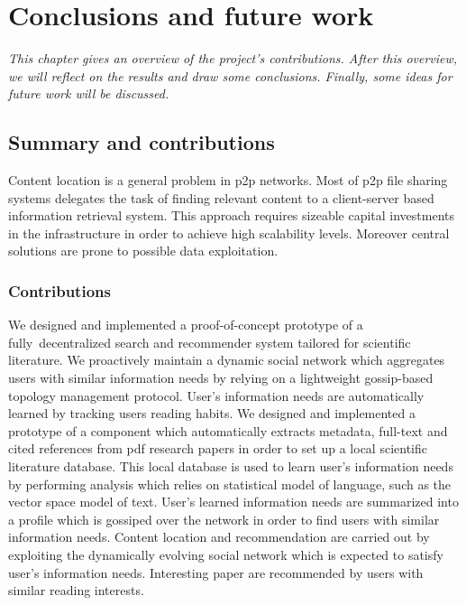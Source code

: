 \chapter{\label{chap:conc}Conclusions and future work}%

\textit{This chapter gives an overview of the project's contributions. After this overview, we will reflect on the results and draw some conclusions. Finally, some ideas for future work will be discussed.}

\section{Summary and contributions}
Content location is a general problem in p2p networks. Most of p2p file sharing systems delegates the task of finding relevant content to a client-server based information retrieval system. This approach requires sizeable capital investments in the infrastructure in order to achieve high scalability levels. Moreover central solutions are prone to possible data exploitation.

\subsection{Contributions}
We designed and implemented a proof-of-concept prototype of a fully~decentralized search and recommender system tailored for scientific literature. We proactively maintain a dynamic social network which aggregates users with similar information needs by relying on a lightweight gossip-based topology management protocol. User's information needs are automatically learned by tracking users reading habits. We designed and implemented a prototype of a component which automatically extracts metadata, full-text and cited references from pdf research papers in order to set up a local scientific literature database. This local database is used to learn user's information needs by performing analysis which relies on statistical model of language, such as the vector space model of text. User's learned information needs are summarized into a profile which is gossiped over the network in order to find users with similar information needs. Content location and recommendation are carried out by exploiting the dynamically evolving social network which is expected to satisfy user's information needs. Interesting paper are recommended by users with similar reading interests.

